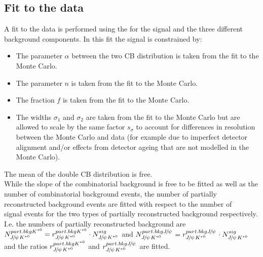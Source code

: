 \subsection{Fit to the \BdToJPsieeKst \lhcb data}
A fit to the \BdToJPsieeKst \lhcb data is performed using the \PDF for the signal and the three different background components. In this fit the signal \PDF is constrained by:
\begin{itemize}
\item The parameter $\alpha$ between the two CB distribution is taken from the fit to the \BdToJPsieeKst Monte Carlo.
\item The parameter $n$ is taken from the fit to the \BdToJPsieeKst Monte Carlo.
\item The fraction $f$ is taken from the fit to the \BdToJPsieeKst Monte Carlo.
\item The widths $\sigma_1$ and $\sigma_2$ are taken from the fit to the \BdToJPsieeKst Monte Carlo but are allowed to scale by the same factor $s_{\sigma}$ to account for differences in resolution between the Monte Carlo and \lhcb data (for example due to imperfect detector alignment and/or effects from detector ageing that are not modelled in the Monte Carlo).
\end{itemize}
The mean of the double CB distribution is free.\\
While the slope of the combinatorial background \PDF is free to be fitted as well as the number of combinatorial background events, the number of partially reconstructed background events are fitted with respect to the number of \\ \BdToJPsieeKst signal events for the two types of partially reconstructed background respectively. I.e. the numbers of partially reconstructed background are \\
$N^{part. bkg K^{*0}}_{{J\mskip -3mu/\mskip -2mu\psi\mskip 2mu} K^{*0}} = r^{part. bkg K^{*0}}_{{J\mskip -3mu/\mskip -2mu\psi\mskip 2mu} K^{*0}} \cdot N^{sig}_{{J\mskip -3mu/\mskip -2mu\psi\mskip 2mu} K^{*0}}$ and $N^{part. bkg {J\mskip -3mu/\mskip -2mu\psi\mskip 2mu}}_{{J\mskip -3mu/\mskip -2mu\psi\mskip 2mu} K^{*0}} = r^{part. bkg {J\mskip -3mu/\mskip -2mu\psi\mskip 2mu}}_{{J\mskip -3mu/\mskip -2mu\psi\mskip 2mu} K^{*0}} \cdot N^{sig}_{{J\mskip -3mu/\mskip -2mu\psi\mskip 2mu} K^{*0}}$ and the ratios $r^{part. bkg K^{*0}}_{{J\mskip -3mu/\mskip -2mu\psi\mskip 2mu} K^{*0}}$ and $r^{part. bkg {J\mskip -3mu/\mskip -2mu\psi\mskip 2mu}}_{{J\mskip -3mu/\mskip -2mu\psi\mskip 2mu} K^{*0}} $ are fitted.\\

